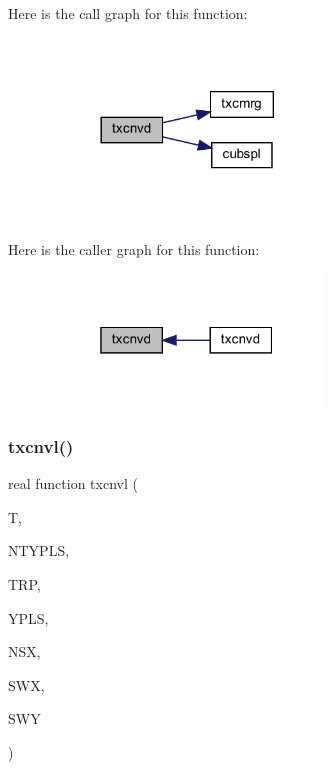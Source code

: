 Here is the call graph for this function\+:\nopagebreak
\begin{figure}[H]
\begin{center}
\leavevmode
\includegraphics[width=209pt]{Leroi_8f90_a1cdfcb6ee629073412c28d9cf0215636_cgraph}
\end{center}
\end{figure}
Here is the caller graph for this function\+:\nopagebreak
\begin{figure}[H]
\begin{center}
\leavevmode
\includegraphics[width=208pt]{Leroi_8f90_a1cdfcb6ee629073412c28d9cf0215636_icgraph}
\end{center}
\end{figure}
\mbox{\label{Leroi_8f90_a1cb0065a1b3068676ef2beb814db93f5}} 
\subsubsection{\texorpdfstring{txcnvl()}{txcnvl()}}
{\footnotesize\ttfamily real function txcnvl (\begin{DoxyParamCaption}\item[{real}]{T,  }\item[{integer}]{N\+T\+Y\+P\+LS,  }\item[{real, dimension(ntypls)}]{T\+RP,  }\item[{real, dimension(4,ntypls)}]{Y\+P\+LS,  }\item[{integer}]{N\+SX,  }\item[{real, dimension(nsx)}]{S\+WX,  }\item[{real, dimension(nsx,3)}]{S\+WY }\end{DoxyParamCaption})}


